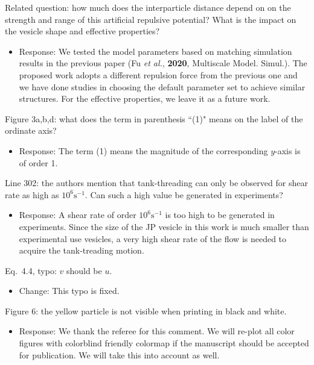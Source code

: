 \documentclass[11pt]{article}
\newcommand{\comment}[1]{{\color{blue} #1}}
\begin{document}
\noindent
\comment{Related question: how much does the interparticle distance
depend on on the strength and range of this artificial repulsive
potential? What is the impact on the vesicle shape and effective
properties?}
\begin{itemize}
  \item Response: We tested the model parameters based on matching simulation results in the previous paper  (Fu {\sl et al.}, {\bf 2020}, Multiscale Model. Simul.). The proposed work adopts a different repulsion force from the previous one and we have done studies in choosing the default parameter set to achieve similar structures. For the effective properties, we leave it as a future work.
\end{itemize}

\noindent
\comment{Figure 3a,b,d: what does the term in parenthesis ``(1)" means
on the label of the ordinate axis?}
\begin{itemize}
  \item Response: The term (1) means the magnitude of the corresponding $y$-axis is of order 1.
\end{itemize}

\noindent
\comment{Line 302: the authors mention that tank-threading can only be
observed for shear rate as high as $10^{6}\text{s}^{-1}$. Can such a
high value be generated in experiments?}
\begin{itemize}
  \item Response: A shear rate of order $10^{6}\text{s}^{-1}$ is too high to be generated in experiments.
Since the size of the JP vesicle in this work is much smaller than experimental use vesicles, 
a very high shear rate of the flow is needed to acquire the tank-treading motion.
\end{itemize}

\noindent
\comment{Eq.~4.4, typo: $v$ should be $u$.}
\begin{itemize}
  \item Change: This typo is fixed.
\end{itemize}

\noindent
\comment{Figure 6: the yellow particle is not visible when printing in
black and white.}
\begin{itemize}
  \item Response: We thank the referee for this comment. We will re-plot all color figures with colorblind friendly colormap if the manuscript should be accepted for publication. We will take this into account as well.
\end{itemize}
\end{document}
